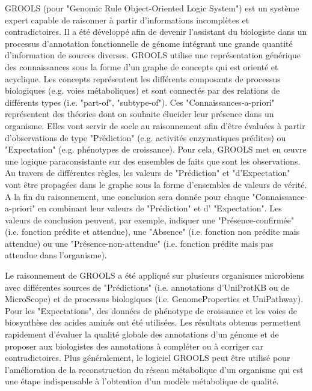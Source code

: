 \documentclass[univ]{thesis}
\begin{document}
\begin{mdframed}[linecolor=psviolet, linewidth=2pt, innerleftmargin=10, innerrightmargin=30, innertopmargin=10, innerbottommargin=50, font=\tiny]
\begin{multicols}{2}
            GROOLS (pour "Genomic Rule Object-Oriented Logic System") est un système expert capable de raisonner à partir d’informations incomplètes et contradictoires. Il a été développé afin de devenir l’assistant du biologiste dans un processus d’annotation fonctionnelle de génome intégrant une grande quantité d’information de sources diverses. GROOLS utilise une représentation générique des connaissances sous la forme d’un graphe de concepts qui est orienté et acyclique. Les concepts représentent les différents composants de processus biologiques (e.g. voies métaboliques) et sont connectés par des relations de différents types (i.e. "part-of", "subtype-of").  Ces "Connaissances-a-priori" représentent des théories dont on souhaite élucider leur présence dans un organisme. Elles vont servir de socle au raisonnement afin d’être évaluées à partir d’observations de type "Prédiction" (e.g. activités enzymatiques prédites) ou "Expectation" (e.g. phénotypes de croissance). Pour cela, GROOLS met en œuvre une logique paraconsistante sur des ensembles de faits que sont les observations. Au travers de différentes règles, les valeurs de "Prédiction" et "d’Expectation" vont être propagées dans le graphe sous la forme d’ensembles de valeurs de vérité. A la fin du raisonnement, une conclusion sera donnée pour chaque "Connaissance-a-priori" en combinant leur valeurs de "Prédiction" et d' "Expectation". Les valeurs de conclusion peuvent, par exemple, indiquer une "Présence-confirmée" (i.e. fonction prédite et attendue), une "Absence" (i.e. fonction non prédite mais attendue) ou une "Présence-non-attendue" (i.e. fonction prédite mais pas attendue dans l’organisme).
            
            Le raisonnement de GROOLS a été appliqué sur plusieurs organismes microbiens avec différentes sources de "Prédictions" (i.e. annotations d’UniProtKB ou de MicroScope) et de processus biologiques (i.e. GenomeProperties et UniPathway). Pour les "Expectations", des données de phénotype de croissance et les voies de biosynthèse des acides aminés ont été utilisées. Les résultats obtenus permettent rapidement d’évaluer la qualité globale des annotations d’un génome et de proposer aux biologistes des annotations à compléter ou à corriger car contradictoires. Plus généralement, le logiciel GROOLS peut être utilisé pour l’amélioration de la reconstruction du réseau métabolique d’un organisme qui est une étape indispensable à l’obtention d’un modèle métabolique de qualité.
        \end{multicols}
    \end{mdframed}
    
\end{document}
